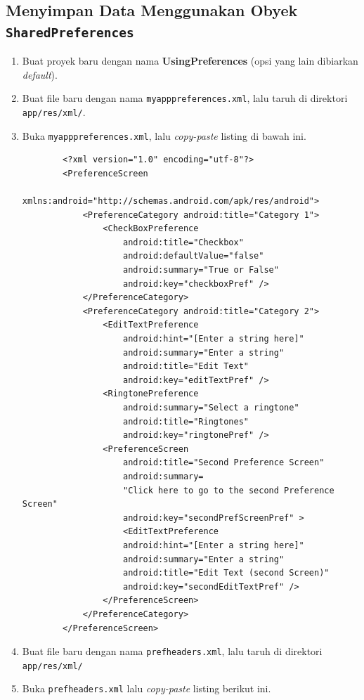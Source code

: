 \documentclass{scrartcl}
\begin{document}
	\subsection{Menyimpan Data Menggunakan Obyek \texttt{SharedPreferences}}
	
	\begin{enumerate}
		\item Buat proyek baru dengan nama \textbf{UsingPreferences} (opsi yang lain dibiarkan \textit{default}).
		
		\item Buat file baru dengan nama \texttt{myapppreferences.xml}, lalu taruh di direktori \\ \texttt{app/res/xml/}.
		
		\item Buka \texttt{myapppreferences.xml}, lalu \textit{copy-paste} listing di bawah ini.
		
		\begin{verbatim}
		<?xml version="1.0" encoding="utf-8"?>
		<PreferenceScreen
			xmlns:android="http://schemas.android.com/apk/res/android">
			<PreferenceCategory android:title="Category 1">
				<CheckBoxPreference
					android:title="Checkbox"
					android:defaultValue="false"
					android:summary="True or False"
					android:key="checkboxPref" />
			</PreferenceCategory>
			<PreferenceCategory android:title="Category 2">
				<EditTextPreference
					android:hint="[Enter a string here]"
					android:summary="Enter a string"
					android:title="Edit Text"
					android:key="editTextPref" />
				<RingtonePreference
					android:summary="Select a ringtone"
					android:title="Ringtones"
					android:key="ringtonePref" />
				<PreferenceScreen
					android:title="Second Preference Screen"
					android:summary=
					"Click here to go to the second Preference Screen"
					android:key="secondPrefScreenPref" >
					<EditTextPreference
					android:hint="[Enter a string here]"
					android:summary="Enter a string"
					android:title="Edit Text (second Screen)"
					android:key="secondEditTextPref" />
				</PreferenceScreen>
			</PreferenceCategory>
		</PreferenceScreen>
		\end{verbatim}
		
		\item Buat file baru dengan nama \texttt{prefheaders.xml}, lalu taruh di direktori \texttt{app/res/xml/}
		
		\item Buka \texttt{prefheaders.xml} lalu \textit{copy-paste} listing berikut ini.
		

\end{enumerate}
\end{document}
